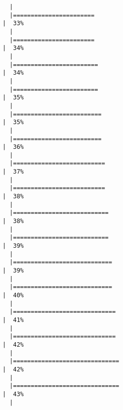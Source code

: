 \documentclass[
  letterpaper,
]{book}
\begin{document}
\begin{verbatim}
  |                                                                            
  |=======================                                               |  33%
  |                                                                            
  |=======================                                               |  34%
  |                                                                            
  |========================                                              |  34%
  |                                                                            
  |========================                                              |  35%
  |                                                                            
  |=========================                                             |  35%
  |                                                                            
  |=========================                                             |  36%
  |                                                                            
  |==========================                                            |  37%
  |                                                                            
  |==========================                                            |  38%
  |                                                                            
  |===========================                                           |  38%
  |                                                                            
  |===========================                                           |  39%
  |                                                                            
  |============================                                          |  39%
  |                                                                            
  |============================                                          |  40%
  |                                                                            
  |=============================                                         |  41%
  |                                                                            
  |=============================                                         |  42%
  |                                                                            
  |==============================                                        |  42%
  |                                                                            
  |==============================                                        |  43%
  |                                                                            

\end{verbatim}
\end{document}

